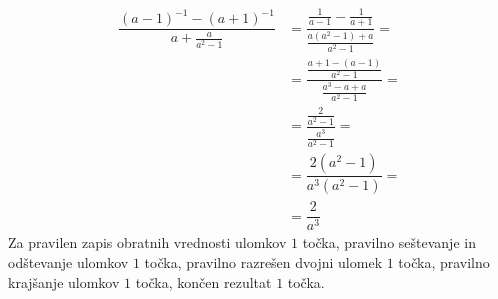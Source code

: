 \documentclass[addpoints,12pt]{exam}
\begin{document}
\begin{questions}
\begin{parts}
            \begin{solution}[7cm]
                \begin{align*}
                    \dfrac{(a-1)^{-1}-(a+1)^{-1}}{a+\frac{a}{a^2-1}} &= \dfrac{\frac{1}{a-1}-\frac{1}{a+1}}{\frac{a(a^2-1)+a}{a^2-1}}= \\
                                                                    &= \dfrac{\frac{a+1-(a-1)}{a^2-1}}{\frac{a^3-a+a}{a^2-1}}= \\
                                                                    &= \dfrac{\frac{2}{a^2-1}}{\frac{a^3}{a^2-1}}= \\
                                                                    &= \dfrac{2(a^2-1)}{a^3(a^2-1)}= \\
                                                                    &= \dfrac{2}{a^3}
                \end{align*}
                Za pravilen zapis obratnih vrednosti ulomkov $1$ točka, pravilno seštevanje in odštevanje ulomkov $1$ točka, pravilno razrešen dvojni ulomek $1$ točka, pravilno krajšanje ulomkov $1$ točka, končen rezultat $1$ točka.
            \end{solution}
    

    
    


\end{parts}
\end{questions}
\end{document}
